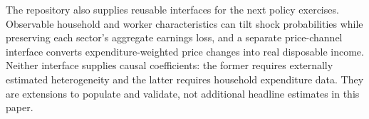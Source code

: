 The repository also supplies reusable interfaces for the next policy exercises.
Observable household and worker characteristics can tilt shock probabilities
while preserving each sector's aggregate earnings loss, and a separate
price-channel interface converts expenditure-weighted price changes into real
disposable income. Neither interface supplies causal coefficients: the former
requires externally estimated heterogeneity and the latter requires household
expenditure data. They are extensions to populate and validate, not additional
headline estimates in this paper.

